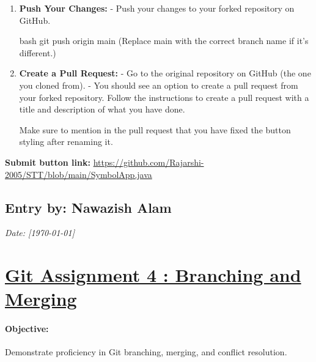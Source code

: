 \documentclass[a4paper,12pt]{article}
\begin{document}
\begin{enumerate}
\item\textbf{Push Your Changes:}
   - Push your changes to your forked repository on GitHub.

   bash
   git push origin main
   (Replace main with the correct branch name if it's different.)\\
   
\item\textbf{Create a Pull Request:}
   - Go to the original repository on GitHub (the one you cloned from).
   - You should see an option to create a pull request from your forked repository. Follow the instructions to create a pull request with a title and description of what you have done.

   Make sure to mention in the pull request that you have fixed the button styling after renaming it.
\end{enumerate}
\vspace{0.5 cm}

\textbf{Submit button link:} \href{https://github.com/Rajarshi-2005/STT/blob/main/SymbolApp.java}{https://github.com/Rajarshi-2005/STT/blob/main/SymbolApp.java}


\newpage
{}
\vspace{-2cm}
\subsection*{Entry by: Nawazish Alam}
\textit{Date: [\today]}\\
\section*{\underline{{\LARGE{Git Assignment 4 : Branching and Merging}}}}

\paragraph{Objective:} Demonstrate proficiency in Git branching, merging, and conflict resolution.

\vspace{0.5cm}
\end{document}
